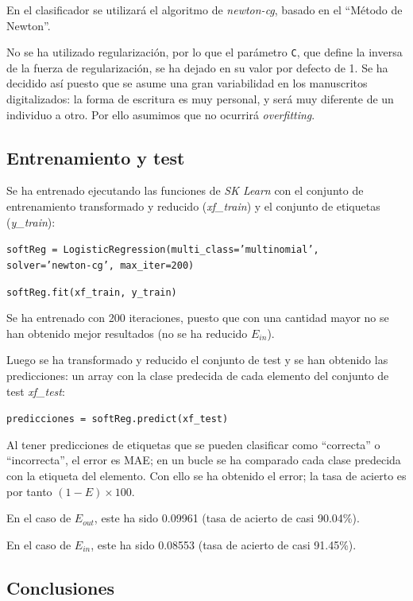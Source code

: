 \documentclass[12pt,spanish]{article} %
\begin{document}
En el clasificador se utilizará el algoritmo de \textit{newton-cg}, basado en el ``Método de Newton''.

No se ha utilizado regularización, por lo que el parámetro \texttt{C}, que define la inversa de la fuerza de regularización, se ha dejado en su valor por defecto de 1. Se ha decidido así puesto que se asume una gran variabilidad en los manuscritos digitalizados: la forma de escritura es muy personal, y será muy diferente de un individuo a otro. Por ello asumimos que no ocurrirá \textit{overfitting}.

\subsection{Entrenamiento y test}

Se ha entrenado ejecutando las funciones de \textit{SK Learn} con el conjunto de entrenamiento transformado y reducido (\textit{xf\_train}) y el conjunto de etiquetas (\textit{y\_train}):

\begin{center}
\texttt{softReg = LogisticRegression(multi\_class='multinomial', solver='newton-cg', max\_iter=200)}

\texttt{softReg.fit(xf\_train, y\_train)}
\end{center}

Se ha entrenado con 200 iteraciones, puesto que con una cantidad mayor no se han obtenido mejor resultados (no se ha reducido $E_{in}$).

Luego se ha transformado y reducido el conjunto de test y se han obtenido las predicciones: un array con la clase predecida de cada elemento del conjunto de test \textit{xf\_test}:

\begin{center}
\texttt{predicciones = softReg.predict(xf\_test)}
\end{center}

Al tener predicciones de etiquetas que se pueden clasificar como ``correcta'' o ``incorrecta'', el error es MAE; en un bucle se ha comparado cada clase predecida con la etiqueta del elemento. Con ello se ha obtenido el error; la tasa de acierto es por tanto $(1-E) \times 100$.

En el caso de $E_{out}$, este ha sido 0.09961 (tasa de acierto de casi 90.04\%).

En el caso de $E_{in}$, este ha sido 0.08553 (tasa de acierto de casi 91.45\%).

\subsection{Conclusiones}
\end{document}
